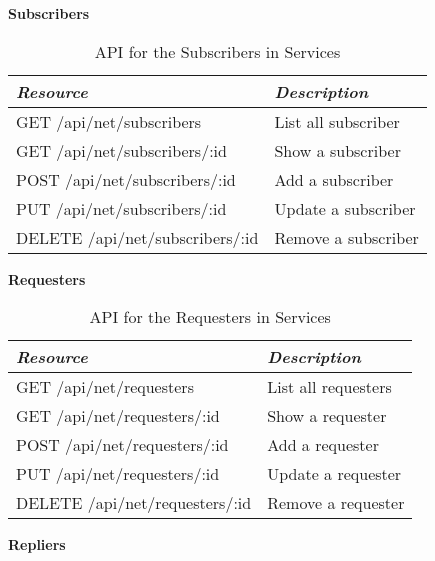       \large{\textbf{Subscribers}}

      \begin{table}[H]
        \centering
        \begin{tabular}{p{8cm} p{10cm}}
          \toprule
          \emph{Resource} & \emph{Description} \\ [0.5ex]
          \midrule
          GET /api/net/subscribers & List all subscriber \\
          GET /api/net/subscribers/:id & Show a subscriber \\
          POST /api/net/subscribers/:id & Add a subscriber \\
          PUT /api/net/subscribers/:id & Update a subscriber \\
          DELETE /api/net/subscribers/:id & Remove a subscriber \\
          \bottomrule
        \end{tabular}
        \caption{API for the Subscribers in Services}\label{tab:rest-common-sub}
      \end{table}

      \large{\textbf{Requesters}}

      \begin{table}[H]
        \centering
        \begin{tabular}{p{8cm} p{10cm}}
          \toprule
          \emph{Resource} & \emph{Description} \\ [0.5ex]
          \midrule
          GET /api/net/requesters & List all requesters \\
          GET /api/net/requesters/:id & Show a requester \\
          POST /api/net/requesters/:id & Add a requester \\
          PUT /api/net/requesters/:id & Update a requester \\
          DELETE /api/net/requesters/:id & Remove a requester \\
          \bottomrule
        \end{tabular}
        \caption{API for the Requesters in Services}\label{tab:rest-common-req}
      \end{table}

      \large{\textbf{Repliers}}

